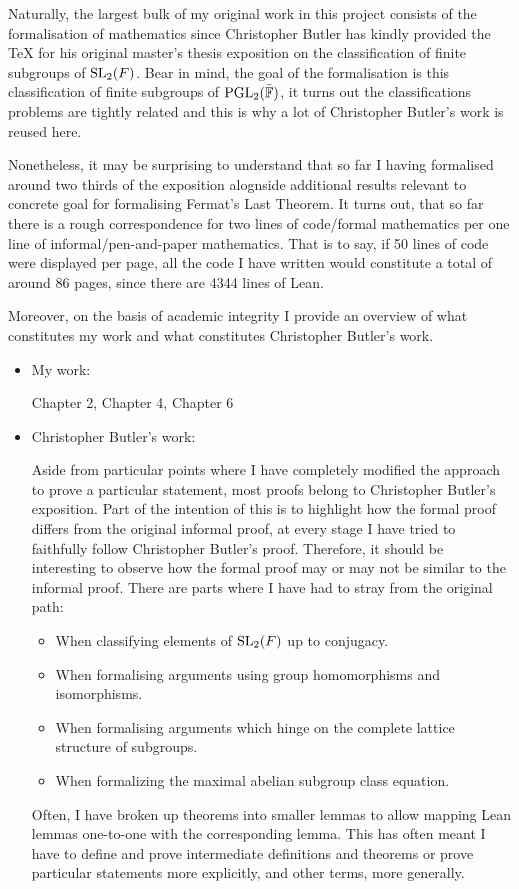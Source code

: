 Naturally, the largest bulk of my original work in this project consists of the formalisation of mathematics since Christopher Butler has kindly provided the TeX for his original master's thesis exposition on
the classification of finite subgroups of $\operatorname{SL}_2(F)$. Bear in mind, the goal of the formalisation is this classification of finite subgroups of $\operatorname{PGL}_2(\bar{\mathbb{F}})$, it turns out the classifications problems are tightly
related and this is why a lot of Christopher Butler's work is reused here.

Nonetheless, it may be surprising to understand that so far I having formalised around two thirds of the exposition alognside additional results relevant to concrete goal for formalising Fermat's Last Theorem.
It turns out, that so far there is a rough correspondence for two lines of code/formal mathematics per one line of informal/pen-and-paper mathematics. That is to say, if 50 lines of code were displayed per page, all
the code I have written would constitute a total of around 86 pages, since there are 4344 lines of Lean.

Moreover, on the basis of academic integrity I provide an overview of what constitutes my work and what constitutes Christopher Butler's work.

\begin{itemize}
    \item My work:
    
    Chapter 2, Chapter 4, Chapter 6

    \item Christopher Butler's work:
    
    Aside from particular points where I have completely modified the approach to prove a particular statement, most proofs belong to Christopher Butler's exposition. Part of the intention of this is to highlight how the formal proof differs from the 
    original informal proof, at every stage I have tried to faithfully follow Christopher Butler's proof. Therefore, it should be interesting to observe how the formal proof may or may not be similar to the informal proof.
    There are parts where I have had to stray from the original path:
    
    \begin{itemize}
        \item When classifying elements of $\operatorname{SL}_2(F)$ up to conjugacy.
        \item When formalising arguments using group homomorphisms and isomorphisms.
        \item When formalising arguments which hinge on the complete lattice structure of subgroups.
        \item When formalizing the maximal abelian subgroup class equation.
    \end{itemize}
    
    Often, I have broken up theorems into smaller lemmas to allow mapping Lean lemmas one-to-one with the corresponding lemma. 
    This has often meant I have to define and prove intermediate definitions and theorems or prove particular statements more explicitly, and other terms, more generally.
\end{itemize}


